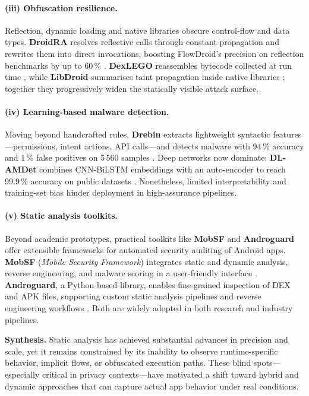 \documentclass[a4paper,12pt]{report}
\begin{document}
\paragraph{(iii) Obfuscation resilience.}
Reflection, dynamic loading and native libraries obscure control-flow and data types.  \textbf{DroidRA} resolves reflective calls through constant-propagation and rewrites them into direct invocations, boosting FlowDroid’s precision on reflection benchmarks by up to 60\,\% \cite{li2016droidra}.  \textbf{DexLEGO} reassembles bytecode collected at run time \cite{ning2019dexlego}, while \textbf{LibDroid} summarises taint propagation inside native libraries \cite{libdroid2022}; together they progressively widen the statically visible attack surface.

\paragraph{(iv) Learning-based malware detection.}
Moving beyond handcrafted rules, \textbf{Drebin} extracts lightweight syntactic features—permissions, intent actions, API calls—and detects malware with 94\,\% accuracy and 1\,\% false positives on 5\,560 samples \cite{arp2014drebin}.  Deep networks now dominate: \textbf{DL-AMDet} combines CNN-BiLSTM embeddings with an auto-encoder to reach 99.9\,\% accuracy on public datasets \cite{nasser2023dlamdet}.  Nonetheless, limited interpretability and training-set bias hinder deployment in high-assurance pipelines.

\paragraph{(v) Static analysis toolkits.}
Beyond academic prototypes, practical toolkits like \textbf{MobSF} and \textbf{Androguard} offer extensible frameworks for automated security auditing of Android apps. \textbf{MobSF} (\emph{Mobile Security Framework}) integrates static and dynamic analysis, reverse engineering, and malware scoring in a user-friendly interface \cite{mobsf2023}. \textbf{Androguard}, a Python-based library, enables fine-grained inspection of DEX and APK files, supporting custom static analysis pipelines and reverse engineering workflows \cite{androguard2023}. Both are widely adopted in both research and industry pipelines.

\medskip
\noindent\textbf{Synthesis.}
Static analysis has achieved substantial advances in precision and scale, yet it remains constrained by its inability to observe runtime-specific behavior, implicit flows, or obfuscated execution paths. These blind spots—especially critical in privacy contexts—have motivated a shift toward hybrid and dynamic approaches that can capture actual app behavior under real conditions.
\end{document}

